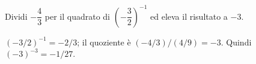 
\begin{esercizio}
Dividi $-\dfrac43$ per il quadrato di $(-\dfrac32)^{-1}$ ed eleva il risultato a $-3$.
\end{esercizio}

\begin{soluzione}
$(-3/2)^{-1}=-2/3$; il quoziente è $(-4/3)/(4/9)=-3$. Quindi $(-3)^{-3}=-1/27$.
\end{soluzione}
